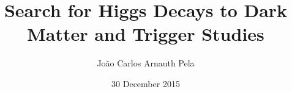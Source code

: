 \documentclass{thesis}
\title{\LARGE Search for Higgs Decays to Dark Matter and Trigger Studies}
\author{João Carlos Arnauth Pela}
\date{30 December 2015}
\begin{document}
\begin{frontmatter}
  
\end{frontmatter}

\begin{mainmatter}
  
  
  
  
  
  
  
  
  
\end{mainmatter}

\begin{backmatter}
  
\end{backmatter}
\end{document}
